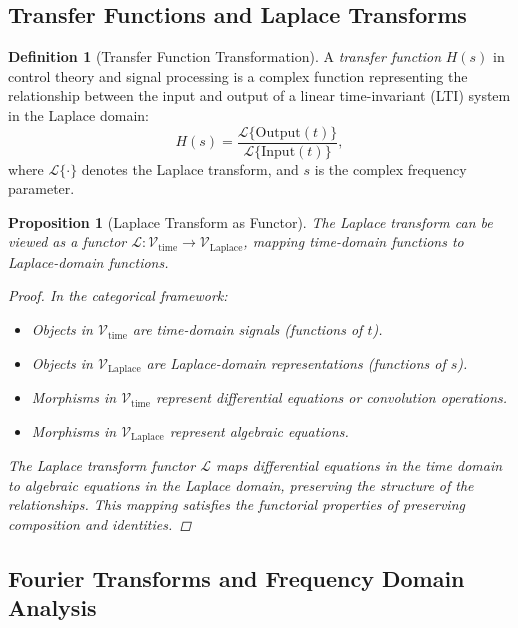 \documentclass{article}
\newtheorem{proposition}{Proposition}[section]
\theoremstyle{definition}
\newtheorem{definition}{Definition}[section]
\theoremstyle{remark}
\begin{document}
	\subsection{Transfer Functions and Laplace Transforms}
	
	\begin{definition}[Transfer Function Transformation]
		A \emph{transfer function} $H(s)$ in control theory and signal processing is a complex function representing the relationship between the input and output of a linear time-invariant (LTI) system in the Laplace domain:
		\[
		H(s) = \dfrac{\mathcal{L}\{ \text{Output}(t) \}}{\mathcal{L}\{ \text{Input}(t) \}},
		\]
		where $\mathcal{L}\{ \cdot \}$ denotes the Laplace transform, and $s$ is the complex frequency parameter.
	\end{definition}
	
	\begin{proposition}[Laplace Transform as Functor]
		The Laplace transform can be viewed as a functor $\mathcal{L}: \mathcal{V}_{\text{time}} \rightarrow \mathcal{V}_{\text{Laplace}}$, mapping time-domain functions to Laplace-domain functions.
		
		\begin{proof}
			In the categorical framework:
			\begin{itemize}
				\item Objects in $\mathcal{V}_{\text{time}}$ are time-domain signals (functions of $t$).
				\item Objects in $\mathcal{V}_{\text{Laplace}}$ are Laplace-domain representations (functions of $s$).
				\item Morphisms in $\mathcal{V}_{\text{time}}$ represent differential equations or convolution operations.
				\item Morphisms in $\mathcal{V}_{\text{Laplace}}$ represent algebraic equations.
			\end{itemize}
			
			The Laplace transform functor $\mathcal{L}$ maps differential equations in the time domain to algebraic equations in the Laplace domain, preserving the structure of the relationships. This mapping satisfies the functorial properties of preserving composition and identities.
		\end{proof}
	\end{proposition}
	
	\subsection{Fourier Transforms and Frequency Domain Analysis}
	
\end{document}

